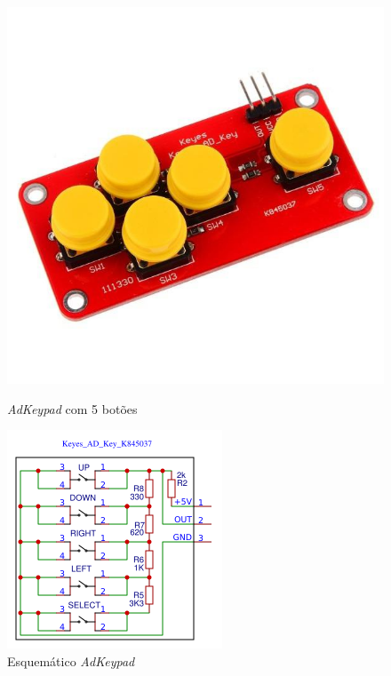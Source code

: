         \begin{figure}[H]
          \centering
          \begin{minipage}[b]{0.3\textwidth}
            \includegraphics[width=\textwidth]{figuras/eletronica/fotos_componentes/adkeypad.jpg}
            \caption{\textit{AdKeypad} com 5 botões}
            \label{fig:keypad_ft}
          \end{minipage}
          \hspace{2cm}
          \begin{minipage}[b]{0.295\textwidth}
            \includegraphics[width=\textwidth]{figuras/eletronica/esquematicos/adkeypad_schematic.png}
            \caption{Esquemático \textit{AdKeypad}}
            \label{fig:keypad_esq}
          \end{minipage}
        \end{figure}
        
